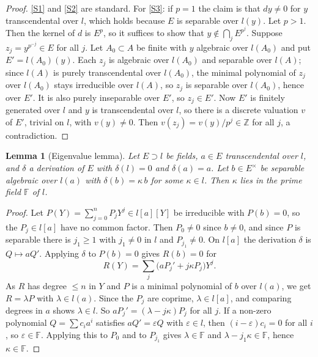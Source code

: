 \documentclass[11pt]{amsart}
\newtheorem{lemma}[theorem]{Lemma}
\theoremstyle{definition}
\theoremstyle{remark}
\newcommand{\ZZ}{\mathbb{Z}}
\newcommand{\FF}{\mathbb{F}}
\begin{document}
\begin{proof}
\ref{S1} and \ref{S2} are standard. For \ref{S3}: if $p=1$ the claim is that $dy\ne0$ for $y$ transcendental over $l$, which holds because $E$ is separable over $l(y)$.
Let $p>1$. Then the kernel of $d$ is $E^p$, so it suffices to show that $y\notin\bigcap_jE^{p^j}$.
Suppose $z_j=y^{p^{-j}}\in E$ for all $j$. Let $A_0\subset A$ be finite with $y$ algebraic over $l(A_0)$ and put $E'=l(A_0)(y)$.
Each $z_j$ is algebraic over $l(A_0)$ and separable over $l(A)$; since $l(A)$ is purely transcendental over $l(A_0)$, the minimal polynomial of $z_j$ over $l(A_0)$ stays irreducible over $l(A)$, so
$z_j$ is separable over $l(A_0)$, hence over $E'$. It is also purely inseparable over $E'$, so $z_j\in E'$.
Now $E'$ is finitely generated over $l$ and $y$ is transcendental over $l$, so there is a discrete valuation $v$ of $E'$, trivial on $l$, with $v(y)\ne0$. Then $v(z_j)=v(y)/p^j\in\ZZ$ for all $j$, a contradiction.
\end{proof}

\begin{lemma}[Eigenvalue lemma]\label{lem:R}
Let $E\supset l$ be fields, $a\in E$ transcendental over $l$, and $\delta$ a derivation of $E$ with $\delta(l)=0$ and $\delta(a)=a$.
Let $b\in E^\times$ be separable algebraic over $l(a)$ with $\delta(b)=\kappa\,b$ for some $\kappa\in l$. Then $\kappa$ lies in the prime field $\FF$ of $l$.
\end{lemma}

\begin{proof}
Let $P(Y)=\sum_{j=0}^nP_jY^j\in l[a][Y]$ be irreducible with $P(b)=0$, so the $P_j\in l[a]$ have no common factor. Then $P_0\ne0$ since $b\neq0$, and since $P$ is separable there is $j_1\geq1$ with $j_1\ne0$ in $l$ and $P_{j_1}\neq0$.
On $l[a]$ the derivation $\delta$ is $Q\mapsto aQ'$. Applying $\delta$ to $P(b)=0$ gives $R(b)=0$ for
\[ R(Y)=\sum_j\bigl(aP_j'+j\kappa P_j\bigr)Y^j . \]
As $R$ has degree $\le n$ in $Y$ and $P$ is a minimal polynomial of $b$ over $l(a)$, we get $R=\lambda P$ with $\lambda\in l(a)$. Since the $P_j$ are coprime, $\lambda\in l[a]$, and comparing degrees in $a$ shows $\lambda\in l$.
So $aP_j'=(\lambda-j\kappa)P_j$ for all $j$. If a non-zero polynomial $Q=\sum c_ia^i$ satisfies $aQ'=\varepsilon Q$ with $\varepsilon\in l$, then $(i-\varepsilon)c_i=0$ for all $i$, so $\varepsilon\in\FF$.
Applying this to $P_0$ and to $P_{j_1}$ gives $\lambda\in\FF$ and $\lambda-j_1\kappa\in\FF$, hence $\kappa\in\FF$.
\end{proof}
\end{document}
